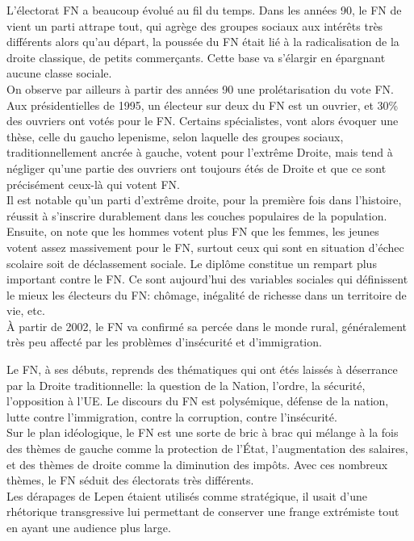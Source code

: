 \documentclass[10pt, a4paper, openany]{book}
\begin{document}
L'électorat FN a beaucoup évolué au fil du temps. Dans les années 90, le FN de vient un parti attrape tout, qui agrège des groupes sociaux aux intérêts très différents alors qu'au départ, la poussée du FN était lié à la radicalisation de la droite classique, de petits commerçants. Cette base va s'élargir en épargnant aucune classe sociale. \\
On observe par ailleurs à partir des années 90 une prolétarisation du vote FN. Aux présidentielles de 1995, un électeur sur deux du FN est un ouvrier, et 30\% des ouvriers ont votés pour le FN. Certains spécialistes, vont alors évoquer une thèse, celle du gaucho lepenisme, selon laquelle des groupes sociaux, traditionnellement ancrée à gauche, votent pour l'extrême Droite, mais tend à négliger qu'une partie des ouvriers ont toujours étés de Droite et que ce sont précisément ceux-là qui votent FN. \\
Il est notable qu'un parti d'extrême droite, pour la première fois dans l'histoire, réussit à s'inscrire durablement dans les couches populaires de la population. \\
Ensuite, on note que les hommes votent plus FN que les femmes, les jeunes votent assez massivement pour le FN, surtout ceux qui sont en situation d'échec scolaire soit de déclassement sociale. Le diplôme constitue un rempart plus important contre le FN. Ce sont aujourd'hui des variables sociales qui définissent le mieux les électeurs du FN: chômage, inégalité de richesse dans un territoire de vie, etc. \\
À partir de 2002, le FN va confirmé sa percée dans le monde rural, généralement très peu affecté par les problèmes d'insécurité et d'immigration. 


Le FN, à ses débuts, reprends des thématiques qui ont étés laissés à déserrance par la Droite traditionnelle: la question de la Nation, l'ordre, la sécurité, l'opposition à l'UE. Le discours du FN est polysémique, défense de la nation, lutte contre l'immigration, contre la corruption, contre l'insécurité. \\
Sur le plan idéologique, le FN est une sorte de bric à brac qui mélange à la fois des thèmes de gauche comme la protection de l'État, l'augmentation des salaires, et des thèmes de droite comme la diminution des impôts. Avec ces nombreux thèmes, le FN séduit des électorats très différents. \\
Les dérapages de Lepen étaient utilisés comme stratégique, il usait d'une rhétorique transgressive lui permettant de conserver une frange extrémiste tout en ayant une audience plus large. 
\end{document}
